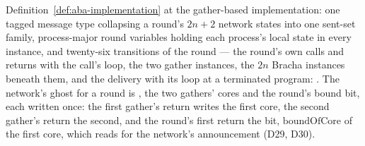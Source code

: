 \begin{definition}
  \label{def:aba-afw-protocol}
  \leanok
  Definition~\ref{def:aba-implementation} at the gather-based implementation: one tagged message type collapsing a round's $2n+2$ network states into one sent-set family, process-major round variables holding each process's local state in every instance, and twenty-six transitions of the round --- the round's own calls and returns with the call's loop, the two gather instances, the $2n$ Bracha instances beneath them, and the delivery with its loop at a terminated program: .
  The network's ghost for a round is , the two gathers' cores and the round's bound bit, each written once: the first gather's return writes the first core, the second gather's return the second, and the round's first return the bit, $\mathrm{boundOfCore}$ of the first core, which  reads for the network's announcement (D29, D30).
\end{definition}
